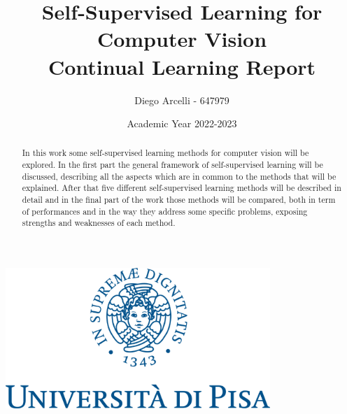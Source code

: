 \documentclass[12pt]{article}
\begin{document}
	
	\begin{titlepage}
		
		\title{Self-Supervised Learning for Computer Vision\\ \vspace{0.25cm} Continual Learning Report}
		\author{Diego Arcelli - 647979}
		\date{Academic Year 2022-2023}
		\maketitle
		\centering
		\includegraphics[width=10cm]{./images/unipi_logo.png}
		
	\end{titlepage}
	
	\tableofcontents
	\newpage
	
	\begin{abstract}
	\noindent In this work some self-supervised learning methods for computer vision will be explored. In the first part the general framework of self-supervised learning will be discussed, describing all the aspects which are in common to the methods that will be explained. After that five different self-supervised learning methods will be described in detail and in the final part of the work those methods will be compared, both in term of performances and in the way they address some specific problems, exposing strengths and weaknesses of each method.
	\end{abstract}
	
\end{document}
